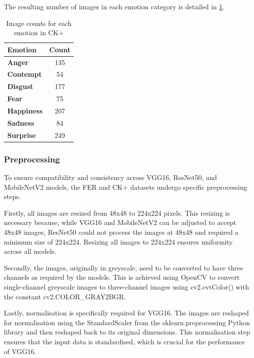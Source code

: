 The resulting number of images in each emotion category is detailed in \ref{tab:emotion_counts_ck+}.

\begin{table}[h!]
\centering
\caption{Image counts for each emotion in CK+}
\begin{tabular}{|l|c|}
\hline
\textbf{Emotion}   & \textbf{Count} \\ \hline
\textbf{Anger}     & 135   \\ \hline
\textbf{Contempt}  & 54    \\ \hline
\textbf{Disgust}   & 177   \\ \hline
\textbf{Fear}      & 75    \\ \hline
\textbf{Happiness} & 207   \\ \hline
\textbf{Sadness}   & 84    \\ \hline
\textbf{Surprise}  & 249   \\ \hline
\end{tabular}
\label{tab:emotion_counts_ck+}
\end{table}

\subsubsection{Preprocessing}

To ensure compatibility and consistency across VGG16, ResNet50, and MobileNetV2 models, the FER and CK+ datasets undergo specific preprocessing steps.

Firstly, all images are resized from 48x48 to 224x224 pixels. This resizing is necessary because, while VGG16 and MobileNetV2 can be adjusted to accept 48x48 images, ResNet50 could not process the images at 48x48 and required a minimum size of 224x224. Resizing all images to 224x224 ensures uniformity across all models.

Secondly, the images, originally in greyscale, need to be converted to have three channels as required by the models. This is achieved using OpenCV to convert single-channel greyscale images to three-channel images using cv2.cvtColor() with the constant cv2.COLOR\_GRAY2BGR. 

Lastly, normalisation is specifically required for VGG16. The images are reshaped for normalisation using the StandardScaler from the sklearn.preprocessing Python library and then reshaped back to its original dimensions. This normalisation step ensures that the input data is standardised, which is crucial for the performance of VGG16.


